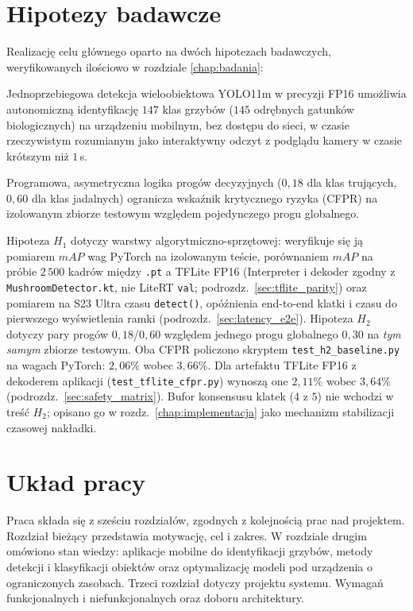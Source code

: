 \section{Hipotezy badawcze}
Realizację celu głównego oparto na dwóch hipotezach badawczych, weryfikowanych ilościowo w rozdziale \ref{chap:badania}:
\begin{description}[topsep=2pt,itemsep=2pt]
 \item[$H_1$] Jednoprzebiegowa detekcja wieloobiektowa YOLO11m w precyzji FP16 umożliwia autonomiczną identyfikację $147$ klas grzybów ($145$ odrębnych gatunków biologicznych) na urządzeniu mobilnym, bez dostępu do sieci, w czasie rzeczywistym rozumianym jako interaktywny odczyt z podglądu kamery w czasie krótszym niż $1$\,s.
 \item[$H_2$] Programowa, asymetryczna logika progów decyzyjnych ($0{,}18$ dla klas trujących, $0{,}60$ dla klas jadalnych) ogranicza wskaźnik krytycznego ryzyka (CFPR) na izolowanym zbiorze testowym względem pojedynczego progu globalnego.
\end{description}
Hipoteza $H_1$ dotyczy warstwy algorytmiczno-sprzętowej: weryfikuje się ją pomiarem $mAP$ wag PyTorch na izolowanym teście, porównaniem $mAP$ na próbie $2\,500$ kadrów między \texttt{.pt} a TFLite FP16 (Interpreter i dekoder zgodny z \texttt{MushroomDetector.kt}, nie LiteRT \texttt{val}; podrozdz.~\ref{sec:tflite_parity}) oraz pomiarem na S23 Ultra czasu \texttt{detect()}, opóźnienia end-to-end klatki i czasu do pierwszego wyświetlenia ramki (podrozdz.~\ref{sec:latency_e2e}). Hipoteza $H_2$ dotyczy pary progów $0{,}18$/$0{,}60$ względem jednego progu globalnego $0{,}30$ na \emph{tym samym} zbiorze testowym. Oba CFPR policzono skryptem \texttt{test\_h2\_baseline.py} na wagach PyTorch: $2{,}06\%$ wobec $3{,}66\%$. Dla artefaktu TFLite FP16 z dekoderem aplikacji (\texttt{test\_tflite\_cfpr.py}) wynoszą one $2{,}11\%$ wobec $3{,}64\%$ (podrozdz.~\ref{sec:safety_matrix}). Bufor konsensusu klatek ($4$ z $5$) nie wchodzi w treść $H_2$; opisano go w rozdz.~\ref{chap:implementacja} jako mechanizm stabilizacji czasowej nakładki.

\section{Układ pracy}
Praca składa się z sześciu rozdziałów, zgodnych z kolejnością prac nad projektem. Rozdział bieżący przedstawia motywację, cel i zakres. W rozdziale drugim omówiono stan wiedzy: aplikacje mobilne do identyfikacji grzybów, metody detekcji i klasyfikacji obiektów oraz optymalizację modeli pod urządzenia o ograniczonych zasobach. Trzeci rozdział dotyczy projektu systemu. Wymagań funkcjonalnych i niefunkcjonalnych oraz doboru architektury.

